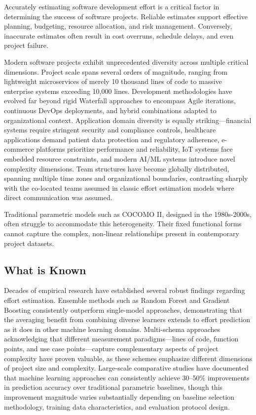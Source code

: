 \documentclass[11pt,a4paper]{article}
\begin{document}
Accurately estimating software development effort is a critical factor in determining the success of software projects. Reliable estimates support effective planning, budgeting, resource allocation, and risk management. Conversely, inaccurate estimates often result in cost overruns, schedule delays, and even project failure.

Modern software projects exhibit unprecedented diversity across multiple critical dimensions. Project scale spans several orders of magnitude, ranging from lightweight microservices of merely 10 thousand lines of code to massive enterprise systems exceeding 10,000 lines. Development methodologies have evolved far beyond rigid Waterfall approaches to encompass Agile iterations, continuous DevOps deployments, and hybrid combinations adapted to organizational context. Application domain diversity is equally striking---financial systems require stringent security and compliance controls, healthcare applications demand patient data protection and regulatory adherence, e-commerce platforms prioritize performance and reliability, IoT systems face embedded resource constraints, and modern AI/ML systems introduce novel complexity dimensions. Team structures have become globally distributed, spanning multiple time zones and organizational boundaries, contrasting sharply with the co-located teams assumed in classic effort estimation models where direct communication was assumed.

Traditional parametric models such as COCOMO II, designed in the 1980s-2000s, often struggle to accommodate this heterogeneity. Their fixed functional forms cannot capture the complex, non-linear relationships present in contemporary project datasets.

\subsection{What is Known}

Decades of empirical research have established several robust findings regarding effort estimation. Ensemble methods such as Random Forest and Gradient Boosting consistently outperform single-model approaches, demonstrating that the averaging benefit from combining diverse learners extends to effort prediction as it does in other machine learning domains. Multi-schema approaches acknowledging that different measurement paradigms---lines of code, function points, and use case points---capture complementary aspects of project complexity have proven valuable, as these schemes emphasize different dimensions of project size and complexity. Large-scale comparative studies have documented that machine learning approaches can consistently achieve 30--50\% improvements in prediction accuracy over traditional parametric baselines, though this improvement magnitude varies substantially depending on baseline selection methodology, training data characteristics, and evaluation protocol design.
\end{document}

